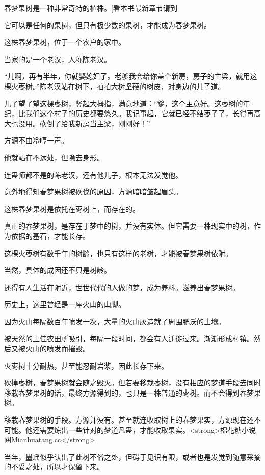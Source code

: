 
\begin{this_body}

春梦果树是一种非常奇特的植株。[看本书最新章节请到

它可以是任何的果树，但只有极少数的果树，才能成为春梦果树。

这株春梦果树，位于一个农户的家中。

当家的是一个老汉，人称陈老汉。

“儿啊，再有半年，你就娶媳妇了。老爹我会给你盖个新房，房子的主梁，就用这棵火枣树。”陈老汉站在树下，拍拍大树坚硬的树皮，对身边的儿子道。

儿子望了望这棵枣树，竖起大拇指，满意地道：“爹，这个主意好。这枣树的年纪，比我们这个村子的历史都要悠久。我记事起，它就已经不结枣子了，长得再高大也没用。砍倒了给我新房当主梁，刚刚好！”

方源不由冷哼一声。

他就站在不远处，但隐去身形。

连蛊师都不是的陈老汉，还有他儿子，根本无法发觉他。

意外地得知春梦果树被砍伐的原因，方源暗暗皱起眉头。

这株春梦果树是依托在枣树上，而存在的。

真正的春梦果树，是存在于梦中的树，并没有实体。但它需要一株现实中的树，作为依据的基石，才能长存。

这棵火枣树有数千年的树龄，也只有这样的老树，才能被春梦果树依附。

当然，具体的成因还不只是树龄。

还得有人生活在附近，世世代代的人做的梦，成为养料。滋养出春梦果树。

历史上，这里曾经是一座火山的山脚。

因为火山每隔数百年喷发一次，大量的火山灰造就了周围肥沃的土壤。

被天然的上佳农田所吸引，每隔一段时间，都会有人迁徙过来。渐渐形成村镇。然后又被火山的喷发而摧毁。

火枣树十分耐热，甚至能忍耐岩浆，因此长存下来。

砍掉枣树，春梦果树就会随之毁灭。但若要移栽枣树，没有相应的梦道手段去同时移栽春梦果树的话，最终方源得到的，也只是一株普通的枣树。而不会得到春梦果树。

移栽春梦果树的手段。方源并没有。甚至就连收取树上的春梦果实，方源现在还不可能。他还需要炼出一些针对的梦道凡蛊，才能收取果实。<strong>棉花糖小说网Mianhuatang.cc</strong>

当年，墨瑶似乎认出了此树不俗之处，但碍于见识有限，或者也是发觉到随意采摘的不妥之处，所以才保留下来。


\end{this_body}
